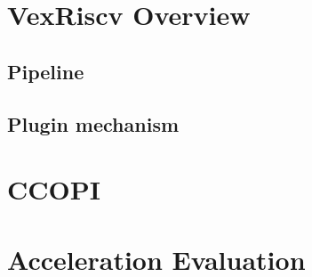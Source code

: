 \documentclass[twoside,twocolumn]{article}
\begin{document}
\section{VexRiscv Overview}
\subsection{Pipeline}
\subsection{Plugin mechanism}
\section{CCOPI}
\section{Acceleration Evaluation}



\end{document}
